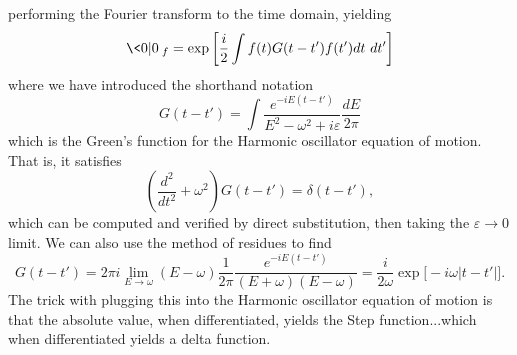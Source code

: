 performing the Fourier transform to the time domain, yielding
\begin{equation}%
\<0|0\>_{f} = \exp\left[\frac{i}{2}\int f(t)G(t-t')f(t')dt~dt'\right]
\end{equation}
where we have introduced the shorthand notation
\begin{equation}%
G(t-t') = \int\frac{e^{-iE(t-t')}}{E^{2}-\omega^{2}+i\varepsilon}\frac{dE}{2\pi}
\end{equation}
which is the Green's function for the Harmonic oscillator
equation of motion. That is, it satisfies
\begin{equation}%
\left(\frac{d^{2}}{dt^{2}}+\omega^{2}\right)G(t-t') = \delta(t-t'),
\end{equation}
which can be computed and verified by direct substitution, then
taking the $\varepsilon\to0$ limit. We can also use the method of
residues to find
\begin{equation}%
G(t-t')=2\pi
i\lim_{E\to\omega}(E-\omega)\frac{1}{2\pi}\frac{e^{-iE(t-t')}}{(E+\omega)(E-\omega)}
= \frac{i}{2\omega}\exp\big[-i\omega|t-t'|\big].
\end{equation}
The trick with plugging this into the Harmonic oscillator
equation of motion is that the absolute value, when
differentiated, yields the Step function...which when
differentiated yields a delta function.
